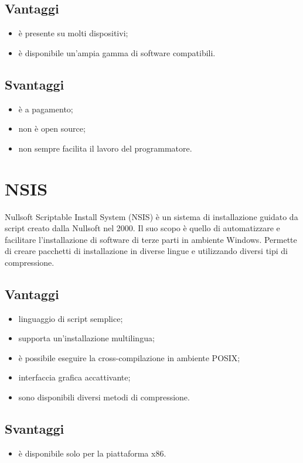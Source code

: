 \subsection*{Vantaggi}
\begin{itemize}
	\item è presente su molti dispositivi;
	\item è disponibile un'ampia gamma di software compatibili.
\end{itemize}
\subsection*{Svantaggi}
\begin{itemize}
	\item è a pagamento;
	\item non è open source;
	\item non sempre facilita il lavoro del programmatore.
\end{itemize}
\section{NSIS}
Nullsoft Scriptable Install System (NSIS) è un sistema di installazione guidato da script creato dalla Nullsoft nel 2000. Il suo scopo è quello di automatizzare e facilitare l'installazione di software di terze parti in ambiente Windows. Permette di creare pacchetti di installazione in diverse lingue e utilizzando diversi tipi di compressione.
\subsection*{Vantaggi}
\begin{itemize}
	\item linguaggio di script semplice;
	\item supporta un'installazione multilingua;
	\item è possibile eseguire la cross-compilazione in ambiente POSIX;
	\item interfaccia grafica accattivante;
	\item sono disponibili diversi metodi di compressione.
\end{itemize}
\subsection*{Svantaggi}
\begin{itemize}
	\item è disponibile solo per la piattaforma x86.
\end{itemize}
